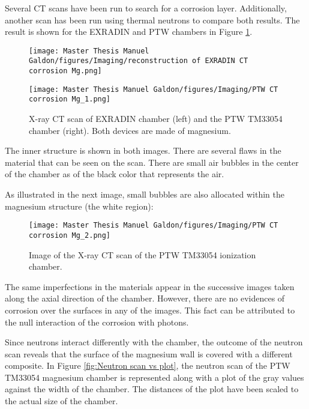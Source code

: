
Several CT scans have been run to search for a corrosion layer. Additionally, another scan has been run using thermal neutrons to compare both results. The result is shown for the EXRADIN and PTW chambers in Figure \ref{fig:Reconstruction-of-PTW-EXRADIN}.

\begin{figure}[!h]
\centering
\begin{minipage}{0.45\textwidth}
    \centering
    \texttt{[image: Master Thesis Manuel Galdon/figures/Imaging/reconstruction of EXRADIN CT corrosion Mg.png]}
\end{minipage}
\hfill
\begin{minipage}{0.45\textwidth}
    \centering
    \texttt{[image: Master Thesis Manuel Galdon/figures/Imaging/PTW CT corrosion Mg\_1.png]}
\end{minipage}
\caption{X-ray CT scan of EXRADIN chamber (left) and the PTW TM33054 chamber (right). Both devices are made of magnesium.}
\label{fig:Reconstruction-of-PTW-EXRADIN}
\end{figure}

The inner structure is shown in both images. There are several flaws in the material that can be seen on the scan. There are small air bubbles in the center of the chamber as of the black color that represents the air.


As illustrated in the next image, small bubbles are also allocated within the magnesium structure (the white region):
\clearpage
\begin{figure}[!h]
    \centering
    \texttt{[image: Master Thesis Manuel Galdon/figures/Imaging/PTW CT corrosion Mg\_2.png]}
    \caption{Image of the X-ray CT scan of the PTW TM33054 ionization chamber.}
    \label{fig:Image of PTW CT scan}
\end{figure}

The same imperfections in the materials appear in the successive images taken along the axial direction of the chamber. However, there are no evidences of corrosion over the surfaces in any of the images. This fact can be attributed to the null interaction of the corrosion with photons. 

Since neutrons interact differently with the chamber, the outcome of the neutron scan reveals that the surface of the magnesium wall is covered with a different composite. In Figure \ref{fig:Neutron scan vs plot}, the neutron scan of the PTW TM33054 magnesium chamber is represented along with a plot of the gray values against the width of the chamber. The distances of the plot have been scaled to the actual size of the chamber.


